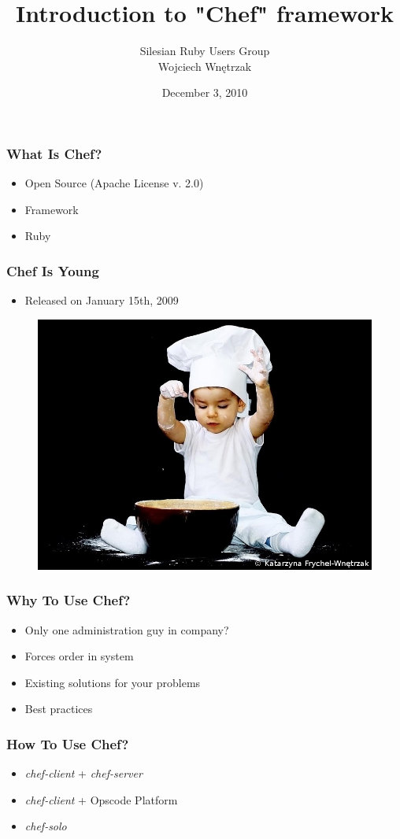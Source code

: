 \documentclass[16pt]{beamer}
\author{Silesian Ruby Users Group\\
  \footnotesize{Wojciech Wnętrzak}}
\date{December 3, 2010}
\title{Introduction to "Chef" framework}
\begin{document}
\frame{\titlepage}

\begin{frame}
  \frametitle{What Is Chef?}
  \begin{itemize}
    \item Open Source (Apache License v. 2.0)
    \item Framework
    \item Ruby
  \end{itemize}
\end{frame}

\begin{frame}
  \frametitle{Chef Is Young}
  \begin{itemize}
    \item Released on January 15th, 2009
  \end{itemize}
  \begin{figure}
    \includegraphics[width=0.8\linewidth]{images/young-chef}
  \end{figure}
\end{frame}

\begin{frame}
  \frametitle{Why To Use Chef?}
  \begin{itemize}
    \item Only one administration guy in company?
    \item Forces order in system
    \item Existing solutions for your problems
    \item Best practices
  \end{itemize}
\end{frame}

\begin{frame}
  \frametitle{How To Use Chef?}
  \begin{itemize}
    \item \emph{chef-client} + \emph{chef-server}
    \item \emph{chef-client} + Opscode Platform
    \item \emph{chef-solo}
  \end{itemize}
\end{frame}
\end{document}

